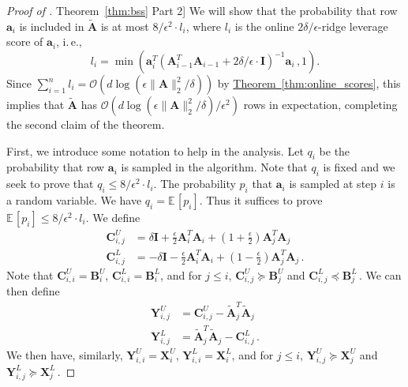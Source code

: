 \documentclass[11pt]{article}
\numberwithin{equation}{section}
\theoremstyle{definition}
\theoremstyle{plain}
\newcommand{\ie}{i.\,e.}
\newcommand{\expref}[2]{\hyperref[#2]{#1~\ref{#2}}}
\newcommand{\Oh}{\ensuremath{\mathcal{O}}}
\newcommand{\bv}[1]{\mathbf{#1}}
\newcommand{\norm}[1]{\|#1\|}
\newcommand{\expct}[3]{\mathbb{E}_{{#1}_{#2}}\left[#3\right]}
\begin{document}
\begin{proof}[Proof of \expref{Theorem}{thm:bss} Part 2]
  We will show that the probability that row $\bv{a}_i$ is included in $\bv{\tilde{A}}$ is at most $8/\epsilon^2 \cdot  l_i$, where $l_i$ is the online $2 \delta/\epsilon$-ridge leverage score of $\bv{a}_i$, \ie,
%
%
$$l_i = \min(\bv{a}_i^T \left ( \bv{A}_{i-1}^T \bv{A}_{i-1} + 2 \delta/ \epsilon \cdot \bv{I} \right )^{-1} \bv{a}_i\,, 1).$$  %
Since $\sum_{i=1}^n l_i = \Oh(d \log (\epsilon\norm{\bv A}_2^2/\delta))$ by \expref{Theorem}{thm:online_scores}, this implies that $\bv{\tilde A}$ has $ \Oh(d \log (\epsilon\norm{\bv A}_2^2/\delta)/\epsilon^2)$ rows in expectation, completing the second claim of the theorem.


First, we introduce some notation to help in the analysis. Let $q_i$ be the probability that row $\bv{a}_i$ is sampled in the algorithm. Note that $q_i$ is fixed and we seek to prove that $q_i \le 8/\epsilon^2\cdot  l_i$. The probability $p_i$ that $\bv{a}_i$ is sampled at step $i$ is a random variable. We have $q_i = \expct{}{}{p_i}$. Thus it suffices to prove $\expct{}{}{p_i} \le  8/\epsilon^2 \cdot  l_i$. We define
\begin{align*}
\bv{C}^U_{i,j} &= \delta \bv{I} + \frac{\epsilon}{2} \bv{A}_i^T \bv{A}_i + \left ( 1 + \frac{\epsilon}{2} \right ) \bv{A}_j^T \bv{A}_j \\
\bv{C}^L_{i,j} &= -\delta \bv{I} - \frac{\epsilon}{2} \bv{A}_i^T \bv{A}_i + \left ( 1 - \frac{\epsilon}{2} \right ) \bv{A}_j^T \bv{A}_j\,.
\end{align*}
Note that $\bv{C}^U_{i,i} = \bv{B}^U_i$, $\bv{C}^L_{i,i} = \bv{B}^L_i$, and for $j \leq i$, $\bv{C}^U_{i,j} \succeq \bv{B}^U_j$ and $\bv{C}^L_{i,j} \preceq \bv{B}^L_j$\,.
We can then define
\begin{align*}
\bv{Y}^U_{i,j} &= \bv{C}^U_{i,j} - \bv{\tilde{A}}_j^T \bv{\tilde{A}}_j \\
\bv{Y}^L_{i,j} &= \bv{\tilde{A}}_j^T \bv{\tilde{A}}_j - \bv{C}^L_{i,j}\,.
\end{align*}
We then have, similarly, $\bv{Y}^U_{i,i} = \bv{X}^U_i$, $\bv{Y}^L_{i,i} = \bv{X}^L_i$, and for $j \leq i$, $\bv{Y}^U_{i,j} \succeq \bv{X}^U_j$ and $\bv{Y}^L_{i,j} \succeq \bv{X}^L_j$\,.


\end{proof}
\end{document}
